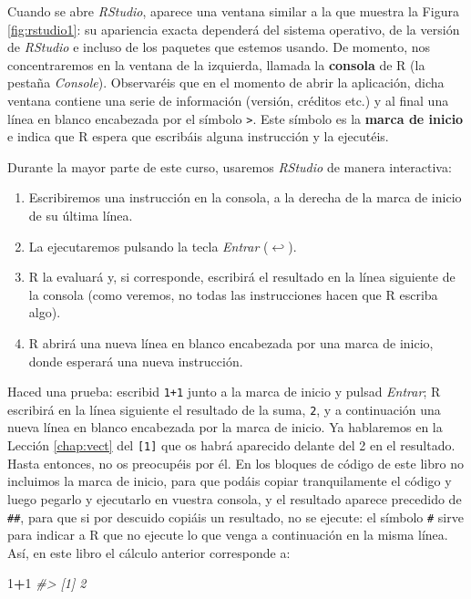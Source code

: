 \documentclass[
]{book}
\newenvironment{Shaded}{\begin{snugshade}}{\end{snugshade}}
\newcommand{\CommentTok}[1]{\textcolor[rgb]{0.56,0.35,0.01}{\textit{#1}}}
\newcommand{\DecValTok}[1]{\textcolor[rgb]{0.00,0.00,0.81}{#1}}
\newcommand{\OperatorTok}[1]{\textcolor[rgb]{0.81,0.36,0.00}{\textbf{#1}}}
\providecommand{\tightlist}{%
  \setlength{\itemsep}{0pt}\setlength{\parskip}{0pt}}
\theoremstyle{definition}
\theoremstyle{definition}
\theoremstyle{definition}
\theoremstyle{remark}
\begin{document}
Cuando se abre \emph{RStudio}, aparece una ventana similar a la que muestra la Figura \ref{fig:rstudio1}: su apariencia exacta dependerá del sistema operativo, de la versión de \emph{RStudio} e incluso de los paquetes que estemos usando. De momento, nos concentraremos en la ventana de la izquierda, llamada la \textbf{consola} de R (la pestaña \emph{Console}). Observaréis que en el momento de abrir la aplicación, dicha ventana contiene una serie de información (versión,
créditos etc.) y al final una línea en blanco encabezada por el símbolo \texttt{\textgreater{}}. Este símbolo es la \textbf{marca de inicio} e indica que R espera que escribáis alguna instrucción y la ejecutéis.

Durante la mayor parte de este curso, usaremos \emph{RStudio} de manera interactiva:

\begin{enumerate}
\def\labelenumi{\arabic{enumi}.}
\tightlist
\item
  Escribiremos una instrucción en la consola, a la derecha de la marca de inicio de su última línea.
\item
  La ejecutaremos pulsando la tecla \emph{Entrar} (\(\hookleftarrow\)).
\item
  R la evaluará y, si corresponde, escribirá el resultado en la línea siguiente de la consola (como veremos, no todas las instrucciones hacen que R escriba algo).
\item
  R abrirá una nueva línea en blanco encabezada por una marca de inicio, donde esperará una nueva instrucción.
\end{enumerate}

Haced una prueba: escribid \texttt{1+1} junto a la marca de inicio y pulsad \emph{Entrar}; R escribirá en la línea siguiente el resultado de la suma, \texttt{2}, y a continuación una nueva línea en blanco encabezada por la marca de inicio.
Ya hablaremos en la Lección \ref{chap:vect} del \texttt{{[}1{]}} que os habrá aparecido delante del 2 en el resultado. Hasta entonces, no os preocupéis por él. En los bloques de código de este libro no incluimos la marca de inicio, para que podáis copiar tranquilamente el código y luego pegarlo y ejecutarlo en vuestra consola, y el resultado aparece precedido de \texttt{\#\#}, para que si por descuido copiáis un resultado, no se ejecute: el símbolo \texttt{\#} sirve para indicar a R que no ejecute lo que venga a continuación en la misma línea. Así, en este libro el cálculo anterior corresponde a:

\begin{Shaded}
\begin{Highlighting}[]
\DecValTok{1}\OperatorTok{+}\DecValTok{1}
\CommentTok{\#\textgreater{} [1] 2}
\end{Highlighting}
\end{Shaded}
\end{document}
